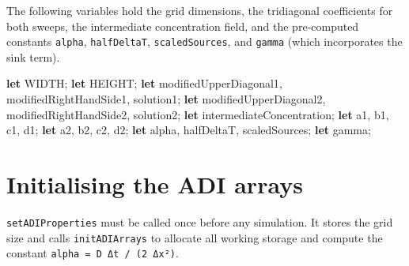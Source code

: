 \documentclass[
  letterpaper,
  DIV=11,
  numbers=noendperiod]{scrreprt}
\newenvironment{Shaded}{\begin{snugshade}}{\end{snugshade}}
\newcommand{\KeywordTok}[1]{\textcolor[rgb]{0.00,0.23,0.31}{\textbf{#1}}}
\newcommand{\NormalTok}[1]{\textcolor[rgb]{0.00,0.23,0.31}{#1}}
\newcommand{\OperatorTok}[1]{\textcolor[rgb]{0.37,0.37,0.37}{#1}}
\begin{document}
The following variables hold the grid dimensions, the tridiagonal
coefficients for both sweeps, the intermediate concentration field, and
the pre‑computed constants \texttt{alpha}, \texttt{halfDeltaT},
\texttt{scaledSources}, and \texttt{gamma} (which incorporates the sink
term).

\label{adi-variables}%
\begin{Shaded}
\begin{Highlighting}[]
\KeywordTok{let}\NormalTok{ WIDTH}\OperatorTok{;}
\KeywordTok{let}\NormalTok{ HEIGHT}\OperatorTok{;}
\KeywordTok{let}\NormalTok{ modifiedUpperDiagonal1}\OperatorTok{,}\NormalTok{ modifiedRightHandSide1}\OperatorTok{,}\NormalTok{ solution1}\OperatorTok{;}
\KeywordTok{let}\NormalTok{ modifiedUpperDiagonal2}\OperatorTok{,}\NormalTok{ modifiedRightHandSide2}\OperatorTok{,}\NormalTok{ solution2}\OperatorTok{;}
\KeywordTok{let}\NormalTok{ intermediateConcentration}\OperatorTok{;}
\KeywordTok{let}\NormalTok{ a1}\OperatorTok{,}\NormalTok{ b1}\OperatorTok{,}\NormalTok{ c1}\OperatorTok{,}\NormalTok{ d1}\OperatorTok{;}
\KeywordTok{let}\NormalTok{ a2}\OperatorTok{,}\NormalTok{ b2}\OperatorTok{,}\NormalTok{ c2}\OperatorTok{,}\NormalTok{ d2}\OperatorTok{;}
\KeywordTok{let}\NormalTok{ alpha}\OperatorTok{,}\NormalTok{ halfDeltaT}\OperatorTok{,}\NormalTok{ scaledSources}\OperatorTok{;}
\KeywordTok{let}\NormalTok{ gamma}\OperatorTok{;}
\end{Highlighting}
\end{Shaded}

\section{Initialising the ADI arrays}\label{initialising-the-adi-arrays}

\texttt{setADIProperties} must be called once before any simulation. It
stores the grid size and calls \texttt{initADIArrays} to allocate all
working storage and compute the constant
\texttt{alpha\ =\ D\ Δt\ /\ (2\ Δx²)}.
\end{document}
